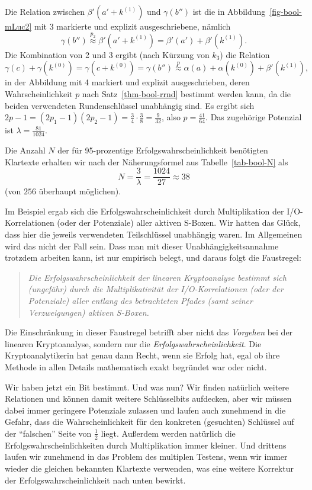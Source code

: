 \begin{refsegment}
Die Relation zwischen $\beta'(a' + k^{(1)})$ und $\gamma(b'')$ ist
die in Abbildung~\ref{fig-bool-mLuc2} mit {\color{red} 3} markierte
und explizit ausgeschriebene, nämlich
\[
     \gamma(b'') \stackrel{p_2}{\approx} \beta'(a' + k^{(1)})
       = \beta'(a') + \beta'(k^{(1)}).
\]
Die Kombination von {\color{red} 2} und {\color{red} 3} ergibt (nach
Kürzung von $k_3$) die Relation
\[
     \gamma(c) + \gamma(k^{(0)}) = \gamma(c + k^{(0)}) = \gamma(b'')
        \stackrel{p}{\approx} \alpha(a) + \alpha(k^{(0)}) + \beta'(k^{(1)}),
\]
in der Abbildung mit {\color{red} 4} markiert und explizit ausgeschrieben,
deren Wahrscheinlichkeit $p$ nach Satz~\ref{thm-bool-rrnd} bestimmt
werden kann, da die beiden verwendeten Rundenschlüssel
unabhängig sind. Es ergibt sich
$2 p - 1 = (2 p_1 - 1)(2 p_2 - 1) = \frac{3}{4}\cdot \frac{3}{8} = \frac{9}{32}$,
also $p = \frac{41}{64}$. Das zugehörige Potenzial ist
$\lambda = \frac{81}{1024}$.

Die Anzahl $N$ der für 95-prozentige Erfolgswahrscheinlichkeit
benötigten Klartexte erhalten wir nach der Näherungsformel aus
Tabelle~\ref{tab-bool-N} als
\[
     N = \frac{3}{\lambda} = \frac{1024}{27} \approx 38
\]
(von $256$ überhaupt möglichen).

Im Beispiel ergab sich die Erfolgswahrscheinlichkeit durch
Multiplikation der I/O-Korrelationen
(oder der Potenziale) aller aktiven
S-Boxen. Wir hatten das Glück, dass hier die
jeweils verwendeten Teilschlüssel unabhängig waren. Im Allgemeinen
wird das nicht der Fall sein. Dass man mit dieser Unabhängigkeitsannahme
trotzdem arbeiten kann, ist nur empirisch belegt, und daraus folgt die
Faustregel:
\begin{quote}
   {\em Die Erfolgswahrscheinlichkeit der linearen Kryptoanalyse bestimmt
   sich (ungefähr) durch die Multiplikativität der
   I/O-Korrelationen (oder der
   Potenziale) aller entlang des betrachteten Pfades (samt
   seiner Verzweigungen) aktiven S-Boxen.}
\end{quote}
Die Einschränkung in dieser Faustregel betrifft aber nicht das {\em Vorgehen}
bei der linearen Kryptoanalyse, sondern nur die {\em Erfolgswahrscheinlichkeit}.
Die Kryptoanalytikerin hat genau dann Recht, wenn sie Erfolg hat, egal ob
ihre Methode in allen Details mathematisch exakt begründet war oder nicht.

Wir haben jetzt ein Bit bestimmt. Und was nun?
Wir finden natürlich weitere Relationen und können
damit weitere Schlüsselbits aufdecken, aber wir müssen dabei immer
geringere Potenziale zulassen und laufen auch zunehmend in die
Gefahr, dass die Wahrscheinlichkeit für den konkreten (gesuchten)
Schlüssel auf der "`falschen"' Seite von $\frac{1}{2}$ liegt.
Außerdem werden natürlich die Erfolgswahrscheinlichkeiten durch
Multiplikation immer kleiner. Und drittens
laufen wir zunehmend in das Problem des multiplen
Testens, wenn wir immer
wieder die gleichen bekannten
Klartexte verwenden, was eine weitere
Korrektur der Erfolgswahrscheinlichkeit nach unten bewirkt.


\end{refsegment}
